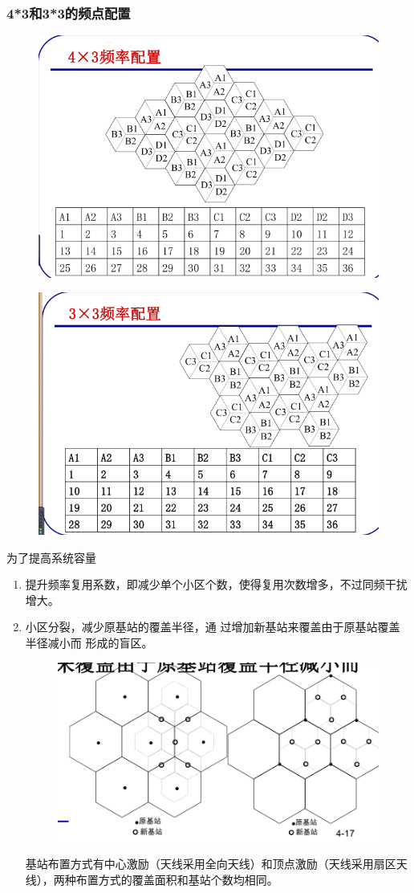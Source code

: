 \subsubsection{4*3和3*3的频点配置}
\begin{figure}[H]
	\centering
	\includegraphics[width=0.7\linewidth]{figures/screenshot005}
	\caption{}
	\label{fig:screenshot005}
\end{figure}
\begin{figure}[H]
	\centering
	\includegraphics[width=0.7\linewidth]{figures/screenshot006}
	\caption{}
	\label{fig:screenshot006}
\end{figure}
为了提高系统容量
\begin{enumerate}
	\item 提升频率复用系数，即减少单个小区个数，使得复用次数增多，不过同频干扰增大。
	\item 小区分裂，减少原基站的覆盖半径，通
	过增加新基站来覆盖由于原基站覆盖半径减小而
	形成的盲区。
	\begin{figure}[tbph]
		\centering
		\includegraphics[width=0.7\linewidth]{figures/screenshot007}
		\caption{}
		\label{fig:screenshot007}
	\end{figure}
	基站布置方式有中心激励（天线采用全向天线）和顶点激励（天线采用扇区天线），两种布置方式的覆盖面积和基站个数均相同。
\end{enumerate}
